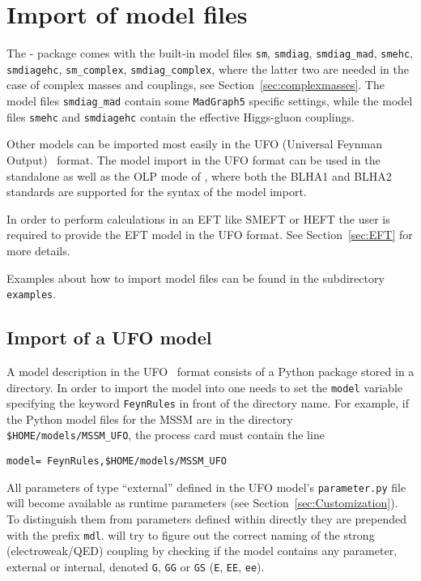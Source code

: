 \section{Import of model files}
\label{sec:model}

The \gosam{}-\gosamversion{} package comes with the built-in model files 
\texttt{sm}, \texttt{smdiag}, \texttt{smdiag\_mad}, \texttt{smehc}, \texttt{smdiagehc},
\texttt{sm\_complex}, \texttt{smdiag\_complex}, 
where the latter two are needed in the case of complex masses and couplings, 
see Section~\ref{sec:complexmasses}. 
The model files \texttt{smdiag\_mad} contain some \texttt{MadGraph5} specific settings, while
the model files \texttt{smehc} and \texttt{smdiagehc} contain the effective Higgs-gluon couplings.

Other models can be imported most easily in the UFO (Universal Feynman Output)~\cite{Degrande:2011ua,Darme:2023jdn} format.
The model import in the UFO format can be used in the standalone as well as the OLP 
mode of \gosam, where both the BLHA1 and BLHA2 standards are supported for the syntax of the model import.

In order to perform calculations in an EFT like SMEFT or HEFT the user is required to provide the EFT model in the UFO format. See Section~\ref{sec:EFT} for more details.

Examples about how to import model files can be found in the subdirectory 
 \texttt{examples}.

\subsection{Import of a UFO model}\label{sec:UFO}
A model description in the UFO~\cite{Degrande:2011ua,Darme:2023jdn} format consists of a Python package
stored in a directory. In order to import the model into \gosam{} one needs
to set the \texttt{model} variable specifying the keyword \texttt{FeynRules}
in front of the directory name.
For example, if the Python model files for the MSSM are in 
 the directory \\
 \texttt{\$HOME/models/MSSM\_UFO}, the process card must contain the line
\begin{lstlisting}[style=in]
model= FeynRules,$HOME/models/MSSM_UFO
\end{lstlisting}
All parameters of type ``external'' defined in the UFO model's \texttt{parameter.py} file will become available as runtime parameters (see Section~\ref{sec:Customization}). To distinguish them from parameters defined within \gosam directly they are prepended with the prefix \texttt{mdl}. \gosam will try to figure out the correct naming of the strong (electroweak/QED) coupling by checking if the model contains any parameter, external or internal, denoted \texttt{G}, \texttt{GG} or \texttt{GS} (\texttt{E}, \texttt{EE}, \texttt{ee}).

